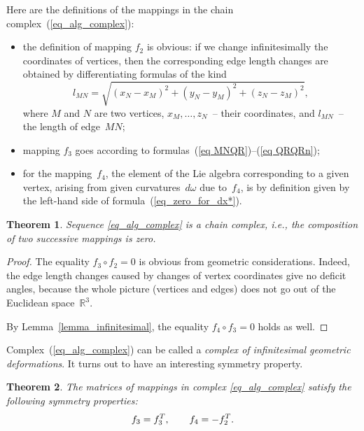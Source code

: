 \documentclass[11pt]{article}
\newtheorem{theorem}{Theorem}
\begin{document}
Here are the def\/initions of the mappings in the chain complex~(\ref{eq_alg_complex}):
\begin{itemize}
\itemsep=0pt
\item the def\/inition of mapping $f_2$ is obvious: if we change inf\/initesimally the coordinates of vertices, then the corresponding edge length changes are obtained by dif\/ferentiating formulas of the kind
\begin{equation}
l_{MN} = \sqrt{(x_N-x_M)^2+(y_N-y_M)^2+(z_N-z_M)^2},
\label{eq_1a}
\end{equation}
where $M$ and $N$ are two vertices, $x_M,\ldots,z_N$~-- their coordinates, and $l_{MN}$~-- the length of edge~$MN$;
\item mapping $f_3$ goes according to formulas~(\ref{eq MNQR})--(\ref{eq QRQRn});
\item for the mapping~$f_4$, the element of the Lie algebra corresponding to a given vertex, arising from given curvatures~$d\omega$ due to~$f_4$, is by def\/inition given by the left-hand side of formula~(\ref{eq_zero_for_dx*}).
\end{itemize}


\begin{theorem}
Sequence \eqref{eq_alg_complex} is a chain complex, i.e., the composition of two successive mappings is zero.
\label{th2}
\end{theorem}

\begin{proof}
The equality $f_3 \circ f_2 = 0$ is obvious from geometric considerations. Indeed, the edge length changes caused by changes of vertex coordinates give no def\/icit angles, because the whole picture (vertices and edges) does not go out of the Euclidean space~$\mathbb R^3$.

By Lemma~\ref{lemma_infinitesimal}, the equality $f_4 \circ f_3 = 0$ holds as well.
\end{proof}

Complex~(\ref{eq_alg_complex}) can be called a \emph{complex of infinitesimal geometric deformations}. It turns out to have an interesting symmetry property.
\begin{theorem}\label{th_symmetry}
The matrices of mappings in complex \eqref{eq_alg_complex} satisfy the following symmetry properties:
\begin{equation}
f_3 = f_3^{\rm T},\qquad f_4 = - f_2^{\rm T}.
\label{eq_symmetry}
\end{equation}
\end{theorem}
\end{document}
